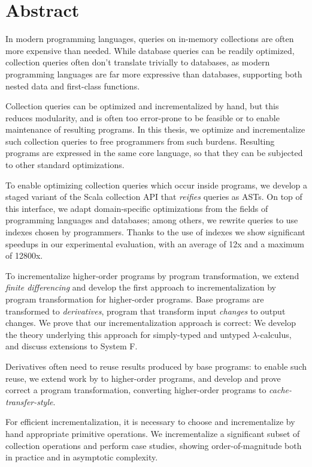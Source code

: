 \chapter{Abstract}

In modern programming languages, queries on in-memory collections are often more
expensive than needed.
While database queries can be readily optimized, collection queries often don't
translate trivially to databases, as modern programming languages are far more
expressive than databases, supporting both nested data and first-class functions.

Collection queries can be optimized and incrementalized by hand, but this
reduces modularity, and is often too error-prone to be feasible or to enable
maintenance of resulting programs.
In this thesis, we optimize and incrementalize such collection queries to free
programmers from such burdens.
Resulting programs are expressed in the same core language, so that they can be
subjected to other standard optimizations.

To enable optimizing collection queries which occur inside programs, we develop a
staged variant of the Scala collection API that \emph{reifies} queries as ASTs.
On top of this interface, we adapt domain-specific optimizations from the fields
of programming languages and databases; among others, we rewrite queries to use
indexes chosen by programmers. Thanks to the use of indexes we show significant
speedups in our experimental evaluation, with an average of 12x and a maximum of
12800x.

To incrementalize higher-order programs by program transformation, we extend
\emph{finite differencing} \citep{Paige82FDC,Blakeley:1986:EUM,Gupta99MMV} and
develop the first approach to incrementalization by program transformation for
higher-order programs. Base programs are transformed to \emph{derivatives},
program that transform input \emph{changes} to output changes.
We prove that our incrementalization approach is correct: We develop the theory
underlying this approach for simply-typed and untyped $\lambda$-calculus, and
discuss extensions to System F\@.

Derivatives often need to reuse results produced by base programs: to enable
such reuse, we extend work by \citet{Liu95} to higher-order programs, and
develop and prove correct a program transformation, converting higher-order
programs to \emph{cache-transfer-style}.

For efficient incrementalization, it is necessary to choose and incrementalize
by hand appropriate primitive operations. We incrementalize a significant subset
of collection operations and perform case studies, showing order-of-magnitude
both in practice and in asymptotic complexity.

